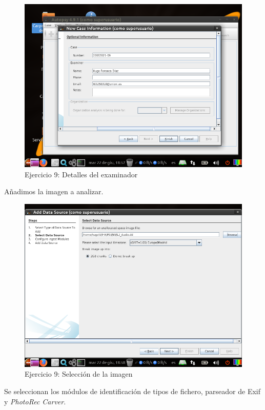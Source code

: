 \documentclass[11pt]{article}
\begin{document}
\begin{figure}[H]
    \caption{Ejercicio 9: Detalles del examinador}
    \centering
    \includegraphics[scale=0.7]{e9-2.png}
\end{figure}

Añadimos la imagen a analizar.

\begin{figure}[H]
    \caption{Ejercicio 9: Selección de la imagen}
    \centering
    \includegraphics[scale=0.7]{e9-3.png}
\end{figure}

Se seleccionan los módulos de identificación de tipos de fichero, parseador de Exif y \textit{PhotoRec Carver}.
\end{document}
